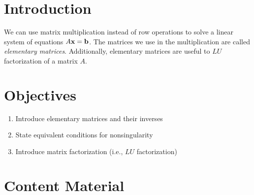 %
\section*{Introduction}

We can use matrix multiplication instead of row operations to solve a linear system of equations $A {\bf x} = {\bf b}$.  The matrices we use in the multiplication are called \textit{elementary matrices}.  Additionally, elementary matrices are useful to $LU$ factorization of a matrix $A$.
\section*{Objectives}
\begin{enumerate}
	\item Introduce elementary matrices and their inverses
	\item State equivalent conditions for nonsingularity
	\item Introduce matrix factorization (i.e., $LU$ factorization)
\end{enumerate}



\section*{Content Material}


